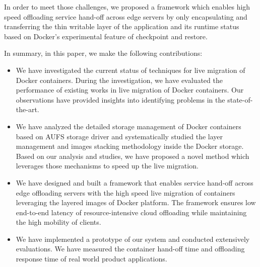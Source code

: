 In order to meet those challenges, we proposed a framework which enables high speed offloading service hand-off across edge servers by only encapsulating and transferring the thin writable layer of the application and its runtime status based on Docker's  experimental feature of checkpoint and restore.

In summary, in this paper, we make the following contributions:
\begin{itemize}
    
    \item We have investigated the current status of techniques for live migration of Docker containers. 
    During the investigation, we have evaluated the performance of existing works in live migration of Docker containers. 
    Our observations have provided insights into identifying problems in the state-of-the-art.
     
    \item  We have analyzed the detailed storage management of Docker containers based on AUFS storage driver and systematically studied the layer management and images stacking methodology inside the Docker storage. Based on our analysis and studies, we have proposed a novel method which leverages those mechanisms to speed up the live migration.
    
 
     \item We have designed and built a framework that enables service hand-off across edge offloading servers with the high speed live migration of containers leveraging the layered images of Docker platform. The framework ensures low end-to-end latency of resource-intensive cloud offloading while maintaining the high mobility of clients. 
     
    \item We have implemented a prototype of our system and conducted extensively evaluations. We have measured the container hand-off time and offloading response time of real world product applications.
    
\end{itemize}